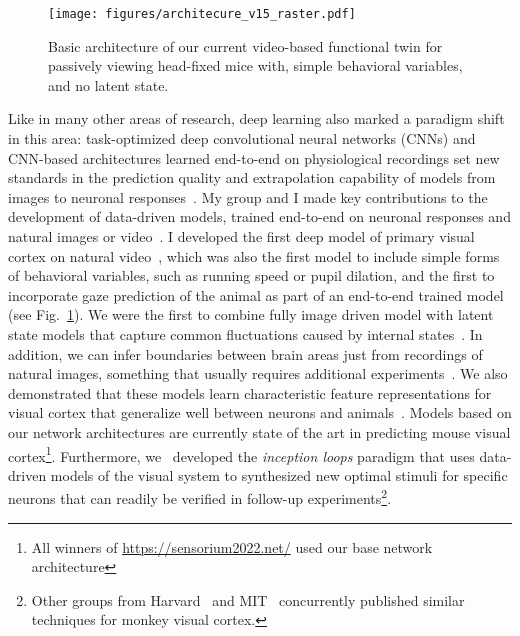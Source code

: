 \documentclass[B2,COG]{ercgrant}
\begin{document}
\begin{figure}
\vspace{-4ex}
\texttt{[image: figures/architecure\_v15\_raster.pdf]}
\caption{Basic architecture of our current video-based functional twin for passively viewing head-fixed mice with, simple behavioral variables, and no latent state.}
\label{fig:videomodel}
\end{figure}
Like in many other areas of research, deep learning also marked a paradigm shift in this area: task-optimized deep convolutional neural networks (CNNs) \parencite{Yamins2014-cg,Cadieu2014-gc,Cadena2017-rb} and CNN-based architectures learned end-to-end on physiological recordings set new standards in the prediction quality and extrapolation capability of models from images to neuronal responses~\parencite{Antolik2016-va,Batty2016-do,McIntosh2016-tr,Klindt2017-sb,Kindel2017-xs,Cadena2017-rb,Burg2021-yg, Lurz2020-ua, Bashiri2021-or,Zhang2018-cs,Cowley2020-cy,Ecker2018-gz, Sinz2018-sk, Walker2019-yw, Franke2022-do}. 
My group and I made key contributions to the development of data-driven models, trained end-to-end on neuronal responses and natural images or video~\parencite{Sinz2018-sk, Walker2019-yw, Lurz2020-ua, Bashiri2021-or, Lurz2022-up, Franke2022-do, Cobos2022-rr, Ecker2018-gz,Cadena2019-jw}. 
I developed the first deep model of primary visual cortex on natural video~\parencite{Sinz2018-sk}, which was also the first model to include simple forms of behavioral variables, such as running speed or pupil dilation, and the first to incorporate gaze prediction of the animal as part of an end-to-end trained model (see Fig.~\ref{fig:videomodel}). 
We were the first to combine fully image driven model with latent state models that capture common fluctuations caused by internal states~\parencite{Bashiri2021-or}.
In addition, we can infer boundaries between brain areas just from recordings of natural images, something that usually requires additional experiments~\parencite{Bashiri2021-or}.
We also demonstrated that these models learn characteristic feature representations for visual cortex that generalize well between neurons and animals~\parencite{Lurz2020-ua,Cobos2022-rr}.
Models based on our network architectures are currently state of the art in predicting mouse visual cortex\footnote{All winners of  \url{https://sensorium2022.net/} used our base network architecture}. 
Furthermore, we~\parencite{Walker2019-yw} developed the \textit{inception loops} paradigm that uses data-driven models of the visual system to synthesized new optimal stimuli for specific neurons that can readily be verified in follow-up experiments\footnote{Other groups from Harvard~\parencite{Ponce2019-yn} and MIT~\parencite{Bashivan2019-ry} concurrently published similar techniques for monkey visual cortex.}. 
\end{document}
